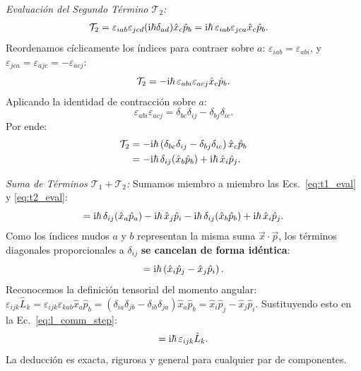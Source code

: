 \textit{Evaluación del Segundo Término $\mathcal{T}_2$:}
\begin{align}
    \mathcal{T}_2 &= \varepsilon_{iab}\varepsilon_{jcd}(\mathrm{i}\hbar\delta_{ad})\hat{x}_c\hat{p}_b = \mathrm{i}\hbar\,\varepsilon_{iab}\varepsilon_{jca}\hat{x}_c\hat{p}_b.
\end{align}
Reordenamos cíclicamente los índices para contraer sobre $a$: $\varepsilon_{iab} = \varepsilon_{abi}$, y $\varepsilon_{jca} = \varepsilon_{ajc} = -\varepsilon_{acj}$:
\begin{equation}
    \mathcal{T}_2 = -\mathrm{i}\hbar\,\varepsilon_{abi}\varepsilon_{acj}\hat{x}_c\hat{p}_b.
\end{equation}
Aplicando la identidad de contracción sobre $a$:
\begin{equation}
    \varepsilon_{abi}\varepsilon_{acj} = \delta_{bc}\delta_{ij} - \delta_{bj}\delta_{ic}.
\end{equation}
Por ende:
\begin{align}
    \mathcal{T}_2 &= -\mathrm{i}\hbar\left(\delta_{bc}\delta_{ij} - \delta_{bj}\delta_{ic}\right)\hat{x}_c\hat{p}_b \nonumber\\
    &= -\mathrm{i}\hbar\,\delta_{ij}(\hat{x}_b\hat{p}_b) + \mathrm{i}\hbar\,\hat{x}_i\hat{p}_j.
    \label{eq:t2_eval}
\end{align}

\textit{Suma de Términos $\mathcal{T}_1 + \mathcal{T}_2$:}
Sumamos miembro a miembro las Ecs.~\eqref{eq:t1_eval} y \eqref{eq:t2_eval}:
\begin{equation}
    [\hat{L}_i, \hat{L}_j] = \iu\hbar\,\delta_{ij}(\hat{x}_a\hat{p}_a) - \iu\hbar\,\hat{x}_j\hat{p}_i - \iu\hbar\,\delta_{ij}(\hat{x}_b\hat{p}_b) + \iu\hbar\,\hat{x}_i\hat{p}_j.
\end{equation}
Como los índices mudos $a$ y $b$ representan la misma suma $\vec{x}\cdot\vec{p}$, los términos diagonales proporcionales a $\delta_{ij}$ \textbf{se cancelan de forma idéntica}:
\begin{equation}
    [\hat{L}_i, \hat{L}_j] = \iu\hbar\left(\hat{x}_i\hat{p}_j - \hat{x}_j\hat{p}_i\right).
    \label{eq:l_comm_step}
\end{equation}
Reconocemos la definición tensorial del momento angular: $\varepsilon_{ijk}\hat{L}_k = \varepsilon_{ijk}\varepsilon_{kab}\hat{x}_a\hat{p}_b = (\delta_{ia}\delta_{jb} - \delta_{ib}\delta_{ja})\hat{x}_a\hat{p}_b = \hat{x}_i\hat{p}_j - \hat{x}_j\hat{p}_i$.
Sustituyendo esto en la Ec.~\eqref{eq:l_comm_step}:
\begin{equation}
    [\hat{L}_i, \hat{L}_j] = \iu\hbar\,\varepsilon_{ijk}\hat{L}_k.
\end{equation}
La deducción es exacta, rigurosa y general para cualquier par de componentes.

